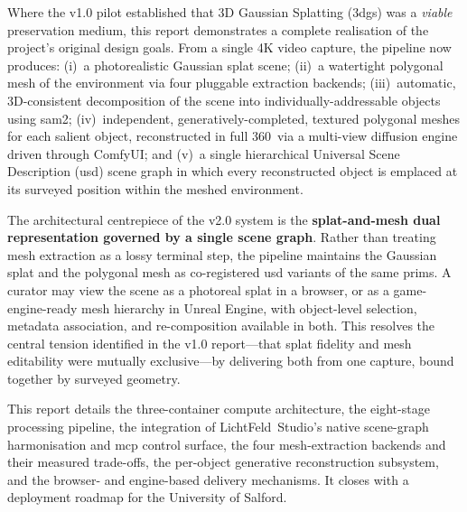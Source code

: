 \documentclass[a4paper,11pt,twoside,openright]{report}
\begin{document}
Where the v1.0 pilot established that 3D Gaussian Splatting (\acrshort{3dgs}) was a \emph{viable} preservation medium, this report demonstrates a complete realisation of the project's original design goals. From a single 4K video capture, the pipeline now produces: (i)~a photorealistic Gaussian splat scene; (ii)~a watertight polygonal mesh of the environment via four pluggable extraction backends; (iii)~automatic, 3D-consistent decomposition of the scene into individually-addressable objects using \acrshort{sam}2; (iv)~independent, generatively-completed, textured polygonal meshes for each salient object, reconstructed in full 360\textdegree\ via a multi-view diffusion engine driven through ComfyUI; and (v)~a single hierarchical Universal Scene Description (\acrshort{usd}) scene graph in which every reconstructed object is emplaced at its surveyed position within the meshed environment.

The architectural centrepiece of the v2.0 system is the \textbf{splat-and-mesh dual representation governed by a single scene graph}. Rather than treating mesh extraction as a lossy terminal step, the pipeline maintains the Gaussian splat and the polygonal mesh as co-registered \acrshort{usd} variants of the same prims. A curator may view the scene as a photoreal splat in a browser, or as a game-engine-ready mesh hierarchy in Unreal Engine, with object-level selection, metadata association, and re-composition available in both. This resolves the central tension identified in the v1.0 report---that splat fidelity and mesh editability were mutually exclusive---by delivering both from one capture, bound together by surveyed geometry.

This report details the three-container compute architecture, the eight-stage processing pipeline, the integration of LichtFeld~Studio's native scene-graph harmonisation and \acrshort{mcp} control surface, the four mesh-extraction backends and their measured trade-offs, the per-object generative reconstruction subsystem, and the browser- and engine-based delivery mechanisms. It closes with a deployment roadmap for the University of Salford.

\tableofcontents
\listoffigures
\listoftables

\printglossary[type=\acronymtype, title={Acronyms and Abbreviations}]

\cleardoublepage
{}
\end{document}

